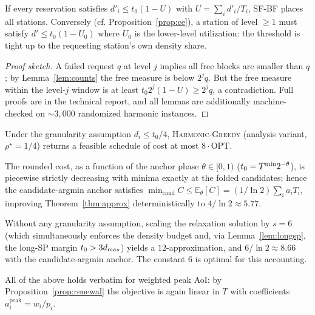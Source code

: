 \begin{lemma}
\label{lem:packing}
If every reservation satisfies $d'_i \le t_0 (1 - U)$ with
$U = \sum_i d'_i/T_i$, SF-BF places all stations. Conversely (cf.
Proposition~\ref{prop:ce}), a station of level $\ge 1$ must satisfy
$d' \le t_0(1 - U_0)$ where $U_0$ is the lower-level utilization: the
threshold is tight up to the requesting station's own density share.
\end{lemma}

\begin{proof}[Proof sketch]
A failed request $q$ at level $j$ implies all free blocks are smaller than
$q$; by Lemma~\ref{lem:counts} the free measure is below $2^j q$. But the
free measure within the level-$j$ window is at least
$t_0 2^j (1-U) \ge 2^j q$, a contradiction. Full proofs are in the
technical report, and all lemmas are additionally machine-checked on
$\sim$$3{,}000$ randomized harmonic instances.
\end{proof}

\begin{theorem}
\label{thm:approx}
Under the granularity assumption $d_i \le t_0/4$, \textsc{Harmonic-Greedy}
(analysis variant, $\rho^\star = 1/4$) returns a feasible schedule of cost
at most $8 \cdot \mathrm{OPT}$.
\end{theorem}

\begin{corollary}
\label{cor:anchor}
The rounded cost, as a function of the anchor phase
$\theta \in [0,1)$ ($t_0 = T^{\min} 2^{-\theta}$), is piecewise strictly
decreasing with minima exactly at the folded candidates; hence the
candidate-argmin anchor satisfies
$\min_{\mathrm{cand}} C \le \mathbb{E}_\theta[C] = (1/\ln 2)\sum_i a_i T_i$,
improving Theorem~\ref{thm:approx} deterministically to
$4/\ln 2 \approx 5.77$.
\end{corollary}

\begin{theorem}[unconditional]
\label{thm:uncond}
Without any granularity assumption, scaling the relaxation solution by
$s = 6$ (which simultaneously enforces the density budget and, via
Lemma~\ref{lem:longsp}, the long-SP margin $t_0 > 3d_{\max}$) yields a
$12$-approximation, and $6/\ln 2 \approx 8.66$ with the candidate-argmin
anchor. The constant $6$ is optimal for this accounting.
\end{theorem}

\begin{proposition}
\label{prop:peak}
All of the above holds verbatim for weighted peak AoI: by
Proposition~\ref{prop:renewal} the objective is again linear in $T$ with
coefficients $a^{\mathrm{peak}}_i = w_i/p_i$.
\end{proposition}

